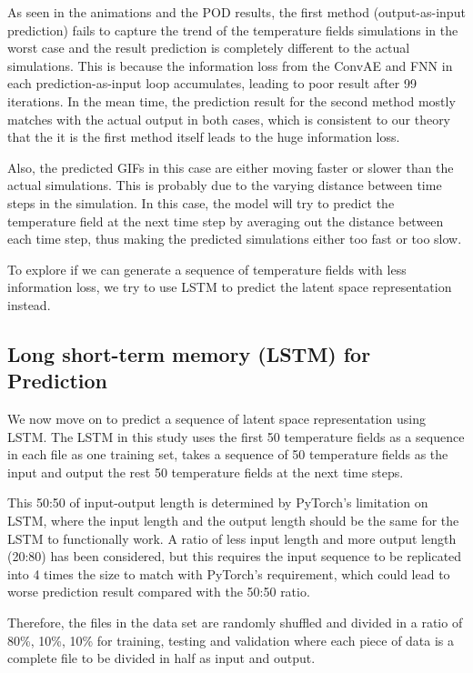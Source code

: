 As seen in the animations and the POD results, the first method (output-as-input prediction) fails to capture the trend of the temperature fields simulations in the worst case and the result prediction is completely different to the actual simulations. This is because the information loss from the ConvAE and FNN in each prediction-as-input loop accumulates, leading to poor result after 99 iterations. In the mean time, the prediction result for the second method mostly matches with the actual output in both cases, which is consistent to our theory that the it is the first method itself leads to the huge information loss.

Also, the predicted GIFs in this case are either moving faster or slower than the actual simulations. This is probably due to the varying distance between time steps in the simulation. In this case, the model will try to predict the temperature field at the next time step by averaging out the distance between each time step, thus making the predicted simulations either too fast or too slow.

To explore if we can generate a sequence of temperature fields with less information loss, we try to use LSTM to predict the latent space representation instead.


\subsection{Long short-term memory (LSTM) for Prediction}

We now move on to predict a sequence of latent space representation using LSTM. The LSTM in this study uses the first 50 temperature fields as a sequence in each file as one training set, takes a sequence of 50 temperature fields as the input and output the rest 50 temperature fields at the next time steps.

This 50:50 of input-output length is determined by PyTorch's limitation on LSTM, where the input length and the output length should be the same for the LSTM to functionally work. A ratio of less input length and more output length (20:80) has been considered, but this requires the input sequence to be replicated into 4 times the size to match with PyTorch's requirement, which could lead to worse prediction result compared with the 50:50 ratio.

Therefore, the files in the data set are randomly shuffled and divided in a ratio of 80\%, 10\%, 10\% for training, testing and validation where each piece of data is a complete file to be divided in half as input and output.

